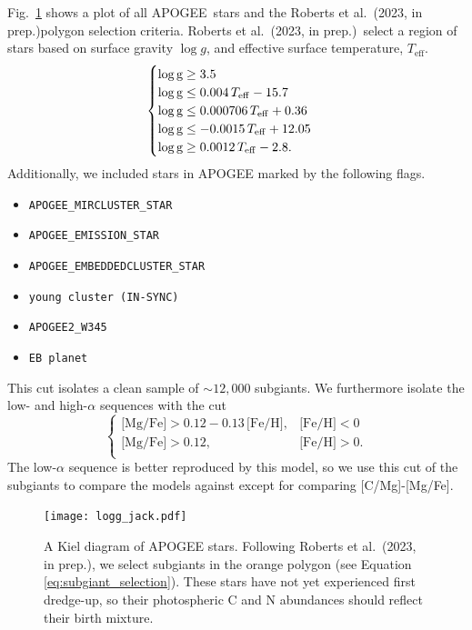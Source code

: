 \documentclass[fleqn,usenatbib]{mnras}
\newcommand{\citetjack}{Roberts et al.~(2023, in prep.)}
\newcommand{\apogee}{APOGEE}
\newcommand{\caafe}{[C/Mg]-[Mg/Fe]}
\newcommand{\about}[1]{${\sim} #1$}
\begin{document}
Fig.~\ref{fig:subgiant_selection} shows a plot of all \apogee\ stars and the \citetjack polygon selection criteria. 
 \citetjack~select a region of stars based on surface gravity $\log g$, and effective surface temperature, $T_\text{eff}$.
 \begin{equation}
    \begin{cases} \label{eq:subgiant_selection}
        \log \text{g} \geq 3.5 \\
        \log \text{g} \leq 0.004\,T_{\rm eff} - 15.7 \\
        \log \text{g} \leq 0.000706\,T_{\rm eff} + 0.36 \\
        \log \text{g} \leq -0.0015\,T_{\rm eff} + 12.05 \\
        \log \text{g} \geq 0.0012\,T_{\rm eff} - 2.8. \\
    \end{cases}
\end{equation}
Additionally, we included stars in \apogee{} marked by the following flags.
\begin{itemize}
\item \verb|APOGEE_MIRCLUSTER_STAR|
\item \verb|APOGEE_EMISSION_STAR|
\item \verb|APOGEE_EMBEDDEDCLUSTER_STAR|
\item \verb|young cluster (IN-SYNC)|
\item \verb|APOGEE2_W345|
\item \verb|EB planet|
\end{itemize}
This cut isolates a clean sample of \about{12,000} subgiants.
We furthermore isolate the low- and high-$\alpha$ sequences with the cut
\begin{equation}\label{eq:high_alpha}
\begin{cases}
\text{[Mg/Fe]} >0.12-0.13\,\text{[Fe/H]}, & \text{[Fe/H]}<0\\
\text{[Mg/Fe]} >0.12, & \text{[Fe/H]}>0. \\
\end{cases}
\end{equation}
The low-$\alpha$ sequence is better reproduced by this model, so we use this cut of the subgiants to compare the models against except for comparing \caafe. 




\begin{figure}
    \centering
    \texttt{[image: logg\_jack.pdf]}
    \caption[]{
        A Kiel diagram of \apogee{} stars. Following \citetjack, we select subgiants in the orange polygon (see Equation \ref{eq:subgiant_selection}). These stars have not yet experienced first dredge-up, so their photospheric C and N abundances should reflect their birth mixture.
    }
    \label{fig:subgiant_selection}
\end{figure}
\end{document}
